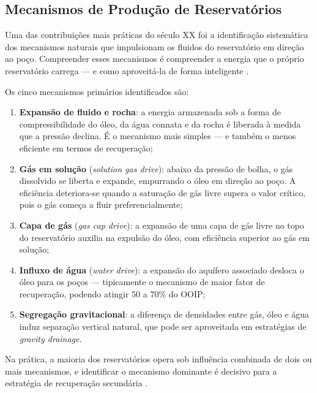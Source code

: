\documentclass[
  12pt,
  a4paper,
  oneside,
  brazilian,
  sumario=tradicional
]{abntex2}
\begin{document}
\subsection{Mecanismos de Produção de Reservatórios}

Uma das contribuições mais práticas do século XX foi a identificação
sistemática dos mecanismos naturais que impulsionam os fluidos do
reservatório em direção ao poço. Compreender esses mecanismos é
compreender a energia que o próprio reservatório carrega — e como
aproveitá-la de forma inteligente \cite{terry2015}.

Os cinco mecanismos primários identificados são:

\begin{enumerate}[label=\roman*.]
  \item \textbf{Expansão de fluido e rocha}: a energia armazenada sob
    a forma de compressibilidade do óleo, da água connata e da rocha
    é liberada à medida que a pressão declina. É o mecanismo mais
    simples — e também o menos eficiente em termos de recuperação;
  \item \textbf{Gás em solução} (\textit{solution gas drive}): abaixo
    da pressão de bolha, o gás dissolvido se liberta e expande,
    empurrando o óleo em direção ao poço. A eficiência deteriora-se
    quando a saturação de gás livre supera o valor crítico, pois
    o gás começa a fluir preferencialmente;
  \item \textbf{Capa de gás} (\textit{gas cap drive}): a expansão de
    uma capa de gás livre no topo do reservatório auxilia na expulsão
    do óleo, com eficiência superior ao gás em solução;
  \item \textbf{Influxo de água} (\textit{water drive}): a expansão
    do aquífero associado desloca o óleo para os poços — tipicamente
    o mecanismo de maior fator de recuperação, podendo atingir 50 a
    70\% do OOIP;
  \item \textbf{Segregação gravitacional}: a diferença de densidades
    entre gás, óleo e água induz separação vertical natural, que pode
    ser aproveitada em estratégias de \textit{gravity drainage}.
\end{enumerate}

Na prática, a maioria dos reservatórios opera sob influência combinada
de dois ou mais mecanismos, e identificar o mecanismo dominante é
decisivo para a estratégia de recuperação secundária
\cite{rosa2006, ahmed2010}.
\end{document}
